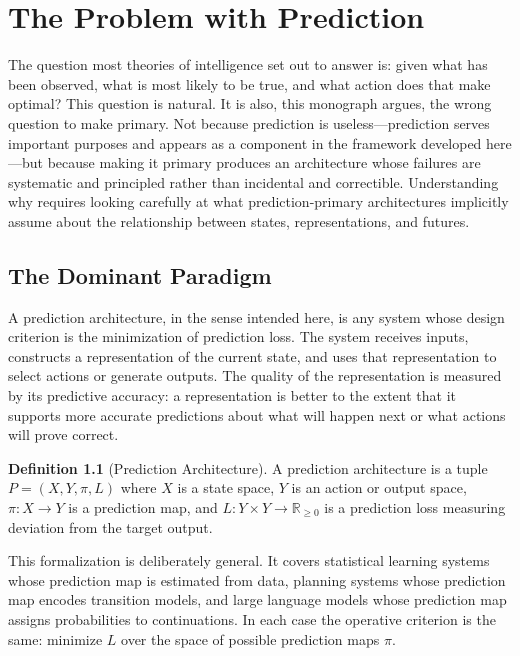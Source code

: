 \documentclass[12pt, oneside]{book}
\theoremstyle{flyxion}
\theoremstyle{definition}
\newtheorem{definition}[theorem]{Definition}
\begin{document}
\chapter{The Problem with Prediction}

The question most theories of intelligence set out to answer is: given
what has been observed, what is most likely to be true, and what action
does that make optimal? This question is natural. It is also, this
monograph argues, the wrong question to make primary. Not because
prediction is useless---prediction serves important purposes and appears
as a component in the framework developed here---but because making it
primary produces an architecture whose failures are systematic and
principled rather than incidental and correctible. Understanding why
requires looking carefully at what prediction-primary architectures
implicitly assume about the relationship between states, representations,
and futures.

\section{The Dominant Paradigm}

A prediction architecture, in the sense intended here, is any system
whose design criterion is the minimization of prediction loss. The
system receives inputs, constructs a representation of the current state,
and uses that representation to select actions or generate outputs. The
quality of the representation is measured by its predictive accuracy: a
representation is better to the extent that it supports more accurate
predictions about what will happen next or what actions will prove
correct.

\begin{definition}[Prediction Architecture]
A prediction architecture is a tuple $P = (X, Y, \pi, L)$ where $X$ is
a state space, $Y$ is an action or output space, $\pi : X \to Y$ is a
prediction map, and $L : Y \times Y \to \mathbb{R}_{\geq 0}$ is a
prediction loss measuring deviation from the target output.
\end{definition}

This formalization is deliberately general. It covers statistical
learning systems whose prediction map is estimated from data, planning
systems whose prediction map encodes transition models, and large
language models whose prediction map assigns probabilities to continuations.
In each case the operative criterion is the same: minimize $L$ over the
space of possible prediction maps $\pi$.
\end{document}

